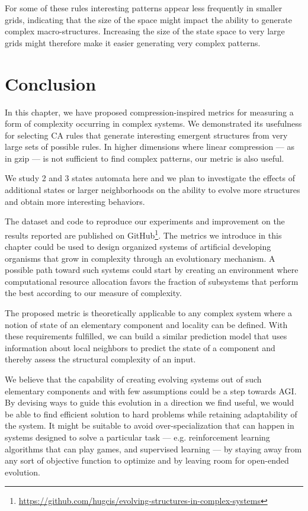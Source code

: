 For some of these rules interesting patterns appear less frequently in smaller
grids, indicating that the size of the space might impact the ability to
generate complex macro-structures. Increasing the size of the state space to
very large grids might therefore make it easier generating very complex patterns.

\section{Conclusion}\label{sec:conclusion}

In this chapter, we have proposed compression-inspired metrics for measuring a
form of complexity occurring in complex systems. We demonstrated its usefulness
for selecting CA rules that generate interesting emergent structures from very
large sets of possible rules. In higher dimensions where linear compression ---
as in gzip --- is not sufficient to find complex patterns, our metric is also
useful.

We study 2 and 3 states automata here and we plan to investigate the effects of
additional states or larger neighborhoods on the ability to evolve more
structures and obtain more interesting behaviors.

The dataset and code to reproduce our experiments and improvement on the results
reported are published on
GitHub\footnote{\url{https://github.com/hugcis/evolving-structures-in-complex-systems}}.
The metrics we introduce in this chapter could be used to design organized
systems of artificial developing organisms that grow in complexity through an
evolutionary mechanism. A possible path toward such systems could start by
creating an environment where computational resource allocation favors the
fraction of subsystems that perform the best according to our measure of
complexity.

The proposed metric is theoretically applicable to any complex system where a
notion of state of an elementary component and locality can be defined. With
these requirements fulfilled, we can build a similar prediction model that uses
information about local neighbors to predict the state of a component and
thereby assess the structural complexity of an input.

We believe that the capability of creating evolving systems out of such
elementary components and with few assumptions could be a step towards AGI. By
devising ways to guide this evolution in a direction we find useful, we would be
able to find efficient solution to hard problems while retaining adaptability of
the system. It might be suitable to avoid over-specialization that can happen in
systems designed to solve a particular task --- e.g. reinforcement learning
algorithms that can play games, and supervised learning --- by staying away from
any sort of objective function to optimize and by leaving room for open-ended
evolution.
